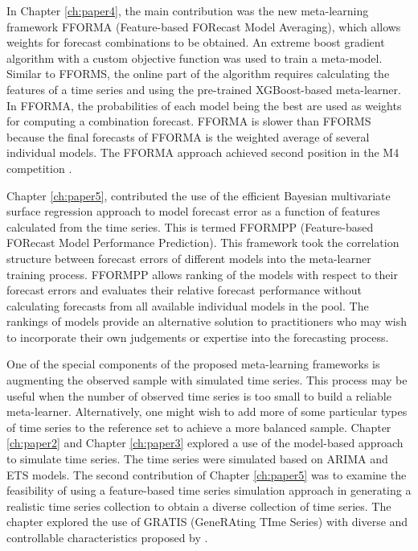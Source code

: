 \documentclass{monashthesis}
\begin{document}
In Chapter \ref{ch:paper4}, the main contribution was the new meta-learning framework FFORMA (Feature-based FORecast Model Averaging), which allows weights for forecast combinations to be obtained. An extreme boost gradient algorithm with a custom objective function was used to train a meta-model. Similar to FFORMS, the online part of the algorithm requires calculating the features of a time series and using the pre-trained XGBoost-based meta-learner. In FFORMA, the probabilities of each model being the best are used as weights for computing a combination forecast. FFORMA is slower than FFORMS because the final forecasts of FFORMA is the weighted average of several individual models. The FFORMA approach achieved second position in the M4 competition \autocite{makridakis2018m4}.

Chapter \ref{ch:paper5}, contributed the use of the efficient Bayesian multivariate surface regression approach to model forecast error as a function of features calculated from the time series. This is termed FFORMPP (Feature-based FORecast Model Performance Prediction). This framework took the correlation structure between forecast errors of different models into the meta-learner training process. FFORMPP allows ranking of the models with respect to their forecast errors and evaluates their relative forecast performance without calculating forecasts from all available individual models in the pool. The rankings of models provide an alternative solution to practitioners who may wish to incorporate their own judgements or expertise into the forecasting process.

One of the special components of the proposed meta-learning frameworks is augmenting the observed sample with simulated time series. This process may be useful when the number of observed time series is too small to build a reliable meta-learner. Alternatively, one might wish to add more of some particular types of time series to the reference set to achieve a more balanced sample. Chapter \ref{ch:paper2} and Chapter \ref{ch:paper3} explored a use of the model-based approach to simulate time series. The time series were simulated based on ARIMA and ETS models. The second contribution of Chapter \ref{ch:paper5} was to examine the feasibility of using a feature-based time series simulation approach in generating a realistic time series collection to obtain a diverse collection of time series. The chapter explored the use of GRATIS (GeneRAting TIme Series) with diverse and controllable characteristics proposed by \textcite{kang2019gratis}.
\end{document}
